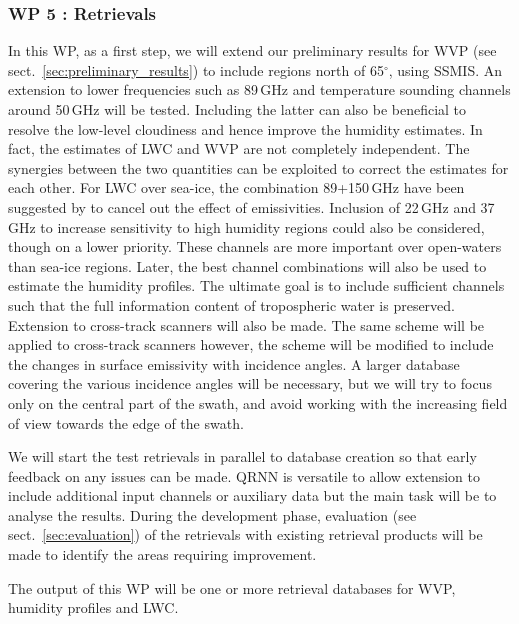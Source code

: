 \documentclass[12pt,oneside,a4paper]{article}
\begin{document}
\subsubsection*{WP 5 : Retrievals}
%
\label{sec:retrievals}
%
In this WP, as a first step, we will extend our preliminary results for WVP (see sect.~\ref{sec:preliminary_results}) to include regions north of 65$^\circ$, using SSMIS. An extension to lower frequencies such as  89\,GHz and temperature sounding channels around 50\,GHz will be tested. Including the latter can also be beneficial to resolve the low-level cloudiness and hence improve the humidity estimates. In fact, the estimates of LWC and WVP are not completely independent. The synergies between the two quantities can be exploited to correct the estimates for each other. For LWC over sea-ice, the combination 89+150\,GHz have been suggested by \citet{laue:2007:poten} to cancel out the effect of emissivities. Inclusion of 22\,GHz and 37\,GHz to increase sensitivity to high humidity regions could also be considered, though on a lower priority. These channels are more important over open-waters than sea-ice regions. Later, the best channel combinations will also be used to estimate the humidity profiles. The ultimate goal is to include sufficient channels such that the full information content of tropospheric water is preserved. Extension to cross-track scanners will also be made. The same scheme will be applied to cross-track scanners however, the scheme will be modified to include the changes in surface emissivity with incidence angles. A larger database covering the various incidence angles will be necessary, but we will try to focus only on the central part of the swath, and avoid working with the increasing field of view towards the edge of the swath. 

We will start the test retrievals in parallel to database creation so that early feedback on any issues can be made. QRNN is versatile to allow extension to include additional input channels or auxiliary data but the main task will be to analyse the results. During the development phase, evaluation (see sect.~\ref{sec:evaluation}) of the retrievals with existing retrieval products will be made to identify the areas requiring improvement.

The output of this WP will be one or more retrieval databases for WVP, humidity profiles and LWC.
\vspace{-1.0ex}
\end{document}
